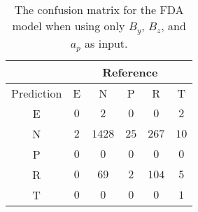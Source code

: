 \begin{table}[!ht]
	\centering
	\begin{tabular}{|c|c|c|c|c|c|}
		\hline
		 & \multicolumn{5}{|c|}{Reference} \\ \hline
		 Prediction & E & N & P & R & T \\ \hline
		 E & $0$ & $2$ & $0$ & $0$ & $2$ \\ \hline
		 N & $2$ & $1428$ & $25$ & $267$ & $10$ \\ \hline
		 P & $0$ & $0$ & $0$ & $0$ & $0$ \\ \hline
		 R & $0$ & $69$ & $2$ & $104$ & $5$ \\ \hline
		 T & $0$ & $0$ & $0$ & $0$ & $1$ \\ \hline
	\end{tabular}
	\caption{The confusion matrix for the FDA model when using only $B_{y}$, $B_{z}$, and $a_{p}$ as input.}
	\label{tab:cm:yzap:fda}
\end{table}
